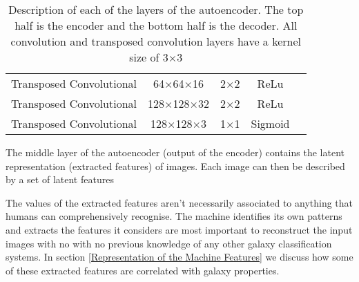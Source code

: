 \documentclass[12pt, onecolumn]{article}
\begin{document}
\begin{table}[H]
\begin{tabular}{c c c c c}
                Transposed Convolutional & 64$\times$64$\times$16 & 2$\times$2 & ReLu \\
    
                Transposed Convolutional & 128$\times$128$\times$32 & 2$\times$2 & ReLu \\
    
                Transposed Convolutional & 128$\times$128$\times$3 & 1$\times$1 & Sigmoid \\


            \end{tabular}
            \caption{Description of each of the layers of the autoencoder. The top half is the encoder and the bottom half is the decoder. All convolution and transposed convolution layers have a kernel size of 3$\times$3}
            \label{autoencoder_layers}
        \end{table}


        
        

        The middle layer of the autoencoder (output of the encoder) contains the latent representation (extracted features) of images. Each image can then be described by a set of latent features
        
        The values of the extracted features aren't necessarily associated to anything that humans can comprehensively recognise. The machine identifies its own patterns and extracts the features it considers are most important to reconstruct the input images with no with no previous knowledge of any other galaxy classification systems. In section \ref{Representation of the Machine Features} we discuss how some of these extracted features are correlated with galaxy properties.

        
\end{document}
